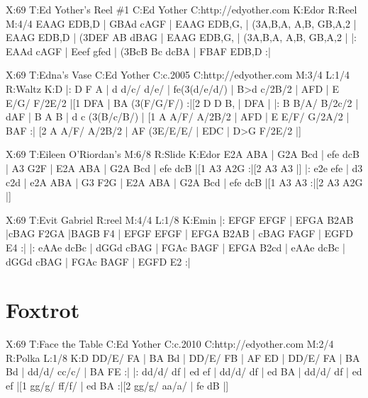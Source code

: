 \documentclass{article}
\begin{document}
\begin{abc}[name]
X:69
T:Ed Yother's Reel \#1
C:Ed Yother
C:http://edyother.com
K:Edor
R:Reel
M:4/4
EAAG EDB,D | GBAd cAGF | EAAG EDB,G, | (3A,B,A, A,B, GB,A,2 |
EAAG EDB,D | (3DEF AB dBAG | EAAG EDB,G, | (3A,B,A, A,B, GB,A,2 |
|:  EAAd cAGF | Eeef gfed | (3BcB Bc dcBA | FBAF EDB,D :|

\end{abc}

\begin{abc}[name]
X:69
T:Edna's Vase
C:Ed Yother
C:c.2005
C:http://edyother.com
M:3/4
L:1/4
R:Waltz
K:D
|:  D F A | d d/c/ d/e/ | fe(3(d/e/d/) |  B>d c/2B/2 |
 AFD | E E/G/ F/2E/2 |[1  DFA | BA (3(F/G/F/) :|[2  D D B, |  DFA |
|:  B B/A/ B/2c/2 | dAF | B A B | d c (3(B/c/B/) |
[1 A A/F/ A/2B/2 | AFD | E E/F/ G/2A/2 | BAF :|
[2 A A/F/ A/2B/2 | AF (3E/E/E/ |  EDC |  D>G F/2E/2 |]
\end{abc}

\begin{abc}[name]
X:69
T:Eileen O'Riordan's
M:6/8
R:Slide
K:Edor
E2A ABA | G2A Bcd | efe dcB | A3 G2F |
E2A ABA | G2A Bcd | efe dcB |[1 A3 A2G :|[2 A3 A3 |]
|: e2e efe | d3 c2d | e2A ABA | G3 F2G |
E2A ABA | G2A Bcd | efe dcB |[1 A3 A3 :|[2 A3 A2G |]
\end{abc}

\begin{abc}[name]
X:69
T:Evit Gabriel
R:reel
M:4/4
L:1/8
K:Emin
|: EFGF EFGF | EFGA B2AB |cBAG F2GA |BAGB F4 |
EFGF EFGF | EFGA B2AB | cBAG FAGF | EGFD E4 :|
|: eAAe dcBc | dGGd cBAG | FGAc BAGF | EFGA B2cd |
eAAe dcBc | dGGd cBAG | FGAc BAGF | EGFD E2 :|
\end{abc}

\section{Foxtrot}

\begin{abc}[name]
X:69
T:Face the Table
C:Ed Yother
C:c.2010
C:http://edyother.com
M:2/4
R:Polka
L:1/8
K:D
DD/E/ FA | BA Bd | DD/E/ FB | AF ED |
DD/E/ FA | BA Bd | dd/d/ cc/c/ | BA FE :|
|: dd/d/ df | ed ef | dd/d/ df | ed BA |
dd/d/ df | ed ef |[1 gg/g/ ff/f/ | ed BA :|[2 gg/g/ aa/a/ | fe dB |]
\end{abc}
\end{document}

